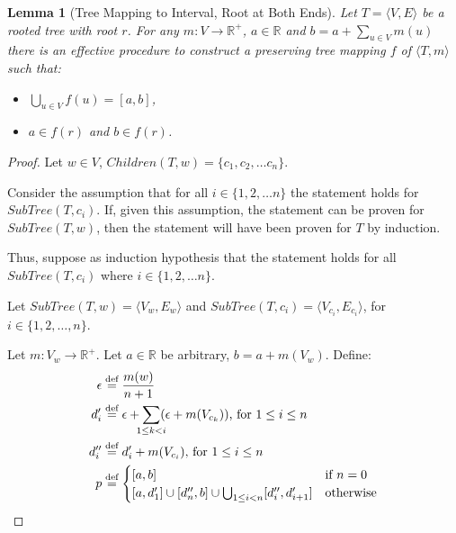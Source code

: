 \documentclass{article}
\newtheorem*{lemma}{Lemma}
\newcommand{\R}{\mathbb{R}}
\newcommand{\eqdef}{\stackrel{\text{def}}{=}}
\begin{document}
\begin{lemma}[Tree Mapping to Interval, Root at Both Ends]
  Let $T = \langle V, E \rangle$ be a rooted tree with root $r$. For any $m : V \rightarrow \R^+$, $a \in \R$ and $b = a + \sum_{u \in V}m(u)$ there is an effective procedure to construct a preserving tree mapping $f$ of $\langle T, m \rangle$ such that:
  \begin{itemize}
  \item $\bigcup_{u \in V}f(u) = [a, b]$,
  \item $a \in f(r)$ and $b \in f(r)$.
  \end{itemize}
\end{lemma}
\begin{proof} Let $w \in V$, $Children(T, w) = \{c_1, c_2, \dots c_n\}$.

  Consider the assumption that for all $i \in \{1, 2, \dots n\}$ the statement holds for $SubTree(T, c_i)$. If, given this assumption, the statement can be proven for $SubTree(T, w)$, then the statement will have been proven for $T$ by induction.

  Thus, suppose as induction hypothesis that the statement holds for all $SubTree(T, c_i)$ where $i \in \{1, 2, \dots n\}$.

  Let $SubTree(T, w) = \langle V_w, E_w \rangle$ and $SubTree(T, c_i) = \langle V_{c_i}, E_{c_i} \rangle$, for $i \in \{1, 2, \dots, n\}$.

  Let $m : V_w \rightarrow \R^+$. Let $a \in \R$ be arbitrary, $b = a + m(V_w)$. Define:
  \begin{align*}
    \epsilon &\eqdef \frac{m(w)}{n + 1} \\
    d'_i &\eqdef \epsilon + \sum_{\mathclap{1 \leq k < i}}(\epsilon + m(V_{c_k})) \text{, for } 1 \leq i \leq n \\
    d''_i &\eqdef d'_i + m(V_{c_i}) \text{, for } 1 \leq i \leq n \\
    p &\eqdef
    \begin{cases}
      [a, b] &\text {if } n = 0 \\
      [a, d'_1] \cup [d''_n, b] \cup \bigcup_{1 \leq i < n} [d''_i, d'_{i+1}] &\text{otherwise}
    \end{cases}
  \end{align*}


\end{proof}
\end{document}
